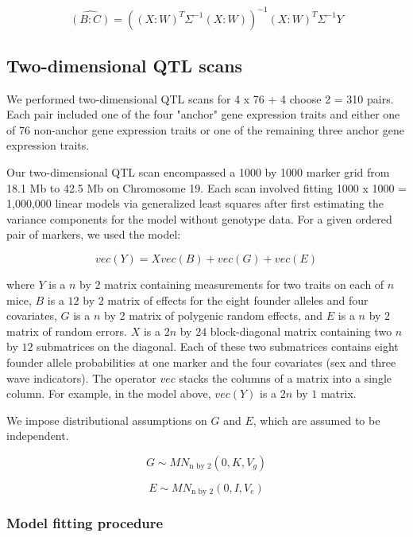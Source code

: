 \documentclass{article}
\begin{document}
\begin{equation}
\widehat {(B:C)} = \left((X:W)^T\Sigma^{-1}(X:W)\right)^{-1}(X:W)^T\Sigma^{-1}Y
\end{equation}

\subsection{Two-dimensional QTL scans}

We performed two-dimensional QTL scans for 4 x 76 + 4 choose 2 = 310 pairs. Each pair included one of the four "anchor" gene expression traits and either one of 76 non-anchor gene expression traits or one of the remaining three anchor gene expression traits. 

Our two-dimensional QTL scan encompassed a 1000 by 1000 marker grid from 18.1 Mb to 42.5 Mb on Chromosome 19. Each scan involved fitting 1000 x 1000 = 1,000,000 linear models via generalized least squares after first estimating the variance components for the model without genotype data. For a given ordered pair of markers, we used the model:

\begin{equation}
vec(Y) = Xvec(B) + vec(G) + vec(E)
\end{equation}

where $Y$ is a $n$ by $2$ matrix containing measurements for two traits on each of $n$ mice, $B$ is a $12$ by $2$ matrix of effects for the eight founder alleles and four covariates, $G$ is a $n$ by $2$ matrix of polygenic random effects, and $E$ is a $n$ by $2$ matrix of random errors. $X$ is a $2n$ by $24$ block-diagonal matrix containing two $n$ by $12$ submatrices on the diagonal. Each of these two submatrices contains eight founder allele probabilities at one marker and the four covariates (sex and three wave indicators). The operator $vec$ stacks the columns of a matrix into a single column. For example, in the model above, $vec(Y)$ is a $2n$ by $1$ matrix. 

We impose distributional assumptions on $G$ and $E$, which are assumed to be independent.

\begin{equation}
G \sim MN_{\text{n by 2}}(0, K, V_g)
\end{equation}

\begin{equation}
E \sim MN_{\text{n by 2}}(0, I, V_e)
\end{equation}

\subsubsection{Model fitting procedure}
\end{document}
